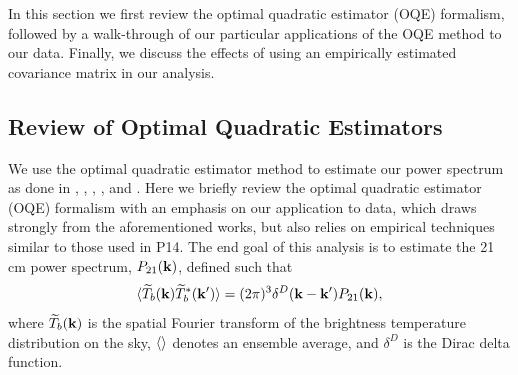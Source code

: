 \documentclass[twocolumn,numberedappendix]{emulateapj} \shorttitle{New Limits on the 21 cm Power Spectrum at $z=8.4$}
\begin{document}
In this section we first
review the optimal quadratic estimator (OQE) formalism, followed by a walk-through of our 
particular applications of the OQE
method to our data. Finally, we discuss the effects of using an empirically estimated 
covariance matrix in our analysis.



%
%
\subsection{Review of Optimal Quadratic Estimators}
We use the optimal quadratic estimator method to estimate our power spectrum as
done in \citet{liu_tegmark2011}, \citet{dillon_et_al2013a}, \citet{liu_et_al2014a}, \citet{liu_et_al2014b}, and \citet{trott_et_al2012}.  Here we briefly review the
optimal quadratic estimator (OQE) formalism with an emphasis on our application
to data, which draws strongly from the aforementioned works, but also relies on empirical
techniques similar to those used in P14. The end goal of this analysis is to estimate the 21 cm
power spectrum, $P_{21}(\mathbf{k})$, defined such that 
\begin{equation}
\label{eqn:pspec_def}
    \expval{\widetilde{T}_{b}(\k)\widetilde{T}^{*}_{b}(\k^{\prime})} =
            (2\pi)^{3}\delta^{D}(\k - \k^{\prime})P_{21}(\k),
\end{equation}
where $\widetilde{T}_{b}(\mathbf{k})$ is the spatial Fourier transform of the brightness temperature
distribution on the sky, $\langle  \rangle$ denotes an ensemble average, and
$\delta^{D}$ is the Dirac delta function. 
\end{document}
